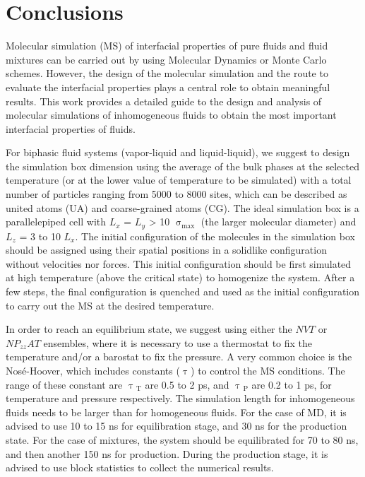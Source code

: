 \documentclass[9pt,tutorial]{livecoms}
\begin{document}
\section{Conclusions}
Molecular simulation (MS) of interfacial properties of pure fluids and fluid
mixtures can be carried out by using Molecular Dynamics or Monte Carlo
schemes. However, the design of the molecular simulation and the route to
evaluate the interfacial properties plays a central role to obtain meaningful
results. This work provides a detailed guide to the design and analysis of
molecular simulations of inhomogeneous fluids to obtain the most important
interfacial properties of fluids.

For biphasic fluid systems (vapor-liquid and liquid-liquid), we suggest to
design the simulation box dimension using the average of the bulk phases at the
selected temperature (or at the lower value of temperature to be simulated)
with a total number of particles ranging from 5000 to 8000 sites, which can be
described as united atoms (UA) and coarse-grained atoms (CG). The ideal
simulation box is a parallelepiped cell with $L_{x}$
= $L_{y}$ {\textgreater} 10 ${\upsigma}_{\mathrm{max}}$ (the larger
molecular diameter) and $L_{z}$ = 3 to 10
$L_{x}$. The initial configuration of the molecules in
the simulation box should be assigned using their spatial positions in
a solidlike configuration without velocities nor forces. This initial
configuration should be first simulated at high temperature (above the critical
state) to homogenize the system. After a few steps, the final configuration is
quenched and used as the initial configuration to carry out the MS at the
desired temperature.

In order to reach an equilibrium state, we suggest using either the $NVT$ or
$NP_{zz}AT$ ensembles, where it is necessary to use
a thermostat to fix the temperature and/or a barostat to fix the pressure. A
very common choice is the Nos\'{e}-Hoover, which includes constants
({${\uptau}$}) to control the MS conditions. The range of these constant are
{${\uptau}$}$_{\mathrm{T}}$ are 0.5 to 2 ps, and
{${\uptau}$}$_{\mathrm{P}}$ are 0.2 to 1 ps, for temperature and pressure respectively. The simulation
length for inhomogeneous fluids needs to be larger than for homogeneous fluids.
For the case of MD, it is advised to use 10 to 15 ns for equilibration stage,
and 30 ns for the production state. For the case of mixtures, the system should
be equilibrated for 70 to 80 ns, and then another 150 ns for production. During
the production stage, it is advised to use block statistics to collect the
numerical results.
\end{document}
